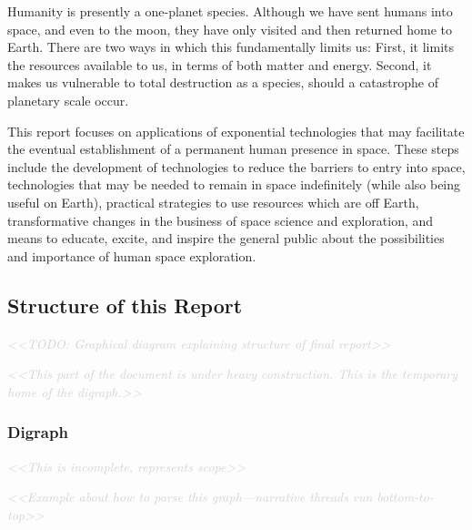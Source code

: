\documentclass[letter,11pt]{article}
\newcommand{\todo}[1]{\textcolor{lightgray}{\textit{<<#1>>}}}
\begin{document}
Humanity is presently a one-planet species. Although we have sent
humans into space, and even to the moon, they have only visited and
then returned home to Earth. There are two ways in which this
fundamentally limits us: First, it limits the resources available to
us, in terms of both matter and energy. Second, it makes us vulnerable
to total destruction as a species, should a catastrophe of planetary
scale occur.

This report focuses on applications of exponential technologies that may
facilitate the eventual establishment of a permanent human presence in space.
These steps include the development of technologies to reduce the barriers to
entry into space, technologies that may be needed to remain in space
indefinitely (while also being useful on Earth), practical strategies to use
resources which are off Earth, transformative changes in the business of space
science and exploration, and means to educate, excite, and inspire the general
public about the possibilities and importance of human space exploration.

\subsection{Structure of this Report}

\todo{TODO: Graphical diagram explaining structure of final report}

\todo{This part of the document is under heavy construction. This is the temporary home of the digraph.}

\subsubsection{Digraph}

\todo{This is incomplete, represents scope}

\todo{Example about how to parse this graph---narrative threads run bottom-to-top}
\end{document}
